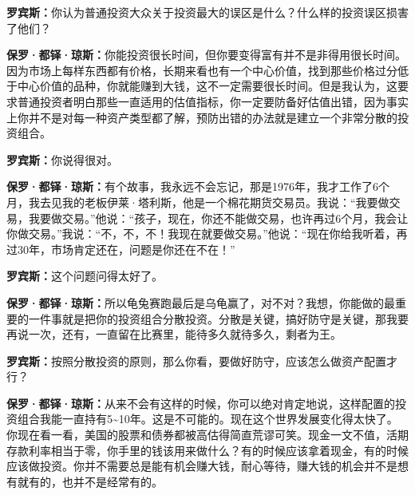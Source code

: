 \begin{BookQuote}
\textbf{罗宾斯：}你认为普通投资大众关于投资最大的误区是什么？什么样的投资误区损害了他们？
\end{BookQuote}

\begin{BookQuote}
\textbf{保罗·都铎·琼斯：}你能投资很长时间，但你要变得富有并不是非得用很长时间。因为市场上每样东西都有价格，长期来看也有一个中心价值，找到那些价格过分低于中心价值的品种，你就能赚到大钱，这不一定需要很长时间。但是我认为，这要求普通投资者明白那些一直适用的估值指标，你一定要防备好估值出错，因为事实上你并不是对每一种资产类型都了解，预防出错的办法就是建立一个非常分散的投资组合。
\end{BookQuote}

\begin{BookQuote}
\textbf{罗宾斯：}你说得很对。
\end{BookQuote}

\begin{BookQuote}
\textbf{保罗·都铎·琼斯：}有个故事，我永远不会忘记，那是1976年，我才工作了6个月，我去见我的老板伊莱·塔利斯，他是一个棉花期货交易员。我说：“我要做交易，我要做交易。”他说：“孩子，现在，你还不能做交易，也许再过6个月，我会让你做交易。”我说：“不，不，不！我现在就要做交易。”他说：“现在你给我听着，再过30年，市场肯定还在，问题是你还在不在！”
\end{BookQuote}

\begin{BookQuote}
\textbf{罗宾斯：}这个问题问得太好了。
\end{BookQuote}

\begin{BookQuote}
\textbf{保罗·都铎·琼斯：}所以龟兔赛跑最后是乌龟赢了，对不对？我想，你能做的最重要的一件事就是把你的投资组合分散投资。分散是关键，搞好防守是关键，那我要再说一次，还有，一直留在比赛里，能待多久就待多久，剩者为王。
\end{BookQuote}

\begin{BookQuote}
\textbf{罗宾斯：}按照分散投资的原则，那么你看，要做好防守，应该怎么做资产配置才行？
\end{BookQuote}

\begin{BookQuote}
\textbf{保罗·都铎·琼斯：}从来不会有这样的时候，你可以绝对肯定地说，这样配置的投资组合我能一直持有5\textasciitilde{}10年。这是不可能的。现在这个世界发展变化得太快了。你现在看一看，美国的股票和债券都被高估得简直荒谬可笑。现金一文不值，活期存款利率相当于零，你手里的钱该用来做什么？有的时候应该拿着现金，有的时候应该做投资。你并不需要总是能有机会赚大钱，耐心等待，赚大钱的机会并不是想有就有的，也并不是经常有的。
\end{BookQuote}

